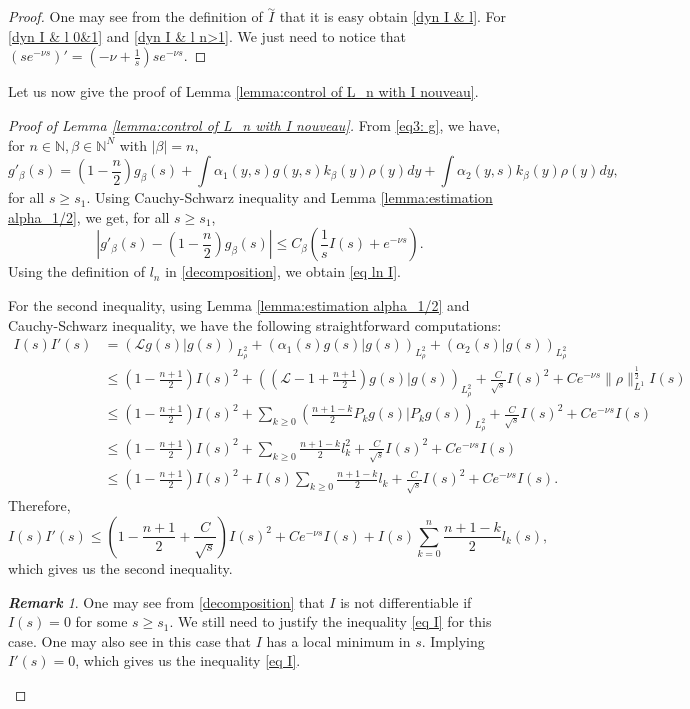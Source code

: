 \documentclass[11pt,a4paper]{article}
\newcommand{\1}{\mathbbm{1}}
\numberwithin{equation}{section}
\newcommand{\numberset}{\mathbb}
\newcommand{\N}{\numberset{N}}
\theoremstyle{remark}
\newtheorem*{remark}{\textbf{Remark}}
\begin{document}
\begin{proof}
One may see from the definition of $\overset{\sim}{I}$ that it is easy obtain \eqref{dyn I & l}. For \eqref{dyn I & l 0&1} and \eqref{dyn I & l n>1}. We just need to notice that $(se^{-\nu s})'=(-\nu+\frac{1}{s})se^{-\nu s}$.
\end{proof}

Let us now give the proof of Lemma \ref{lemma:control of L_n with I nouveau}.
\begin{proof}[Proof of Lemma \ref{lemma:control of L_n with I nouveau}]
From \eqref{eq3: g}, we have, for $n\in \N, \beta\in \N^N$ with $|\beta|=n$,
\begin{equation}\label{eq: proof lemma}
g'_\beta(s)=\left(1-\frac{n}{2}\right)g_\beta(s)+\int\alpha_1(y,s)g(y,s)k_\beta(y)\rho(y) dy+\int\alpha_2(y,s)k_\beta(y)\rho(y) dy,
\end{equation}
for all $s\geq s_1$. Using Cauchy-Schwarz inequality and Lemma \ref{lemma:estimation alpha_1/2}, we get, for all $s\geq s_1$,
$$\left|g'_{\beta}(s)-\left(1-\frac{n}{2}\right)g_{\beta}(s)\right|
\leq C_\beta\left(\frac{1}{s}I(s)+e^{-\nu s}\right).$$
Using the definition of $l_n$ in \eqref{decomposition}, we obtain \eqref{eq ln I}.

For the second inequality, using Lemma \ref{lemma:estimation alpha_1/2} and Cauchy-Schwarz inequality, we have the following straightforward computations:
\begin{equation*}
\begin{aligned}
I(s)I'(s)&=(\mathcal{L}g(s)|g(s))_{L^2_\rho}+(\alpha_1(s)g(s)|g(s))_{L^2_\rho}+(\alpha_2(s)|g(s))_{L^2_\rho}\\
&\leq \left(1-\frac{n+1}{2}\right)I(s)^2+\left(\left(\mathcal{L}-1+\frac{n+1}{2}\right)g(s)|g(s)\right)_{L^2_\rho}+\frac{C}{\sqrt{s}}I(s)^2+Ce^{-\nu s}\|\rho\|_{L^1}^{\frac{1}{2}}I(s)\\
&\leq \left(1-\frac{n+1}{2}\right)I(s)^2+\underset{k\geq 0}{\sum}\left(\frac{n+1-k}{2}P_kg(s)|P_kg(s)\right)_{L^2_\rho}+\frac{C}{\sqrt{s}}I(s)^2+Ce^{-\nu s}I(s)\\
&\leq \left(1-\frac{n+1}{2}\right)I(s)^2+\underset{k\geq 0}{\sum}\frac{n+1-k}{2}l_k^2+\frac{C}{\sqrt{s}}I(s)^2+Ce^{-\nu s}I(s)\\
&\leq \left(1-\frac{n+1}{2}\right)I(s)^2+I(s)\underset{k\geq 0}{\sum}\frac{n+1-k}{2}l_k+\frac{C}{\sqrt{s}}I(s)^2+Ce^{-\nu s}I(s).
\end{aligned}
\end{equation*}
Therefore,
$$I(s)I'(s)\leq\left(1-\frac{n+1}{2}+\frac{C}{\sqrt{s}}\right)I(s)^2+Ce^{-\nu s}I(s)+I(s)\underset{k=0}{\overset{n}{\sum}}\frac{n+1-k}{2}l_{k}(s),$$
which gives us the second inequality. 
\begin{remark}
One may see from \eqref{decomposition} that $I$ is not differentiable if $I(s)=0$ for some $s\geq s_1$. We still need to justify the inequality \eqref{eq I} for this case. One may also see in this case that $I$ has a local minimum in $s$. Implying $I'(s)=0$, which gives us the inequality \eqref{eq I}.
\end{remark}



\end{proof}
\end{document}
